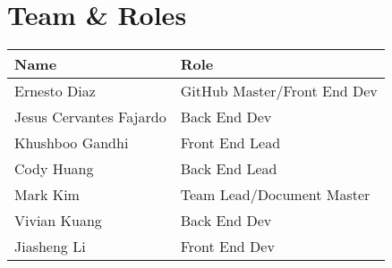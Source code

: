 \pagebreak
\section{Team \& Roles}

\begin{tabular}{ | l | l | }
\hline
Name							& Role\\\hline
Ernesto Diaz					& GitHub Master/Front End Dev\\
Jesus Cervantes Fajardo			& Back End Dev\\
Khushboo Gandhi					& Front End Lead\\
Cody Huang						& Back End Lead\\
Mark Kim						& Team Lead/Document Master\\
Vivian Kuang					& Back End Dev\\
Jiasheng Li						& Front End Dev\\\hline
\end{tabular}